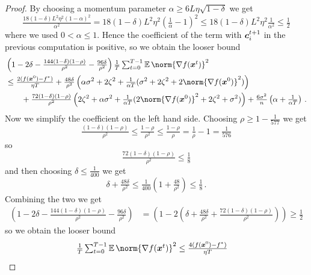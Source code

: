 \documentclass{article}
\begin{document}
\begin{proof}
  By choosing a momentum parameter $\alpha \ge 6 L \eta \sqrt{1-\delta}$ we get
  \[
    \tfrac{18 (1-\delta) L^2 \eta ^2 (1-\alpha)^2}{\alpha^2} 
    =
    18 (1-\delta) L^2 \eta^2 \left(\tfrac{1}{\alpha}-1\right)^2
    \le 
    18 (1-\delta) L^2 \eta^2 \tfrac{1}{\alpha^2}
    \le 
    \tfrac{1}{2}
  \]
  where we used $0 < \alpha \le 1$. Hence the coefficient of the term with $\bm{c}_i^{t+1}$ in the previous computation is positive, so we obtain the looser bound
  \begin{align*}
    & \left(1 - 2 \delta - \tfrac{144(1-\delta)(1-\rho)}{\rho^2} - \tfrac{96 \delta}{\rho^2} \right) \tfrac{1}{T} \tsum_{t=0}^{T-1} \E \norm{\nabla f(\xx^t)}^2 
    \\
     & \le  
    \tfrac{2(f(\xx^0) - f^\ast)}{\eta T}
     +
    \tfrac{48 \delta}{\rho^2} 
    \left(
      \alpha \sigma^2 + 2\zeta^2
      + \tfrac{1}{\alpha T}(\sigma^2 + 2 \zeta^2 + 2\norm{\nabla f(\xx^0)}^2)
    \right)
    \\
     & \qquad + 
    \tfrac{72(1-\delta)(1-\rho)}{\rho^2} 
      \left(      
          2  \zeta^2
        + \alpha\sigma^2                                             
        + \tfrac{1}{\alpha T}(2\norm{\nabla f(\xx^0) }^2
        + 2 \zeta^2
        + \sigma^2)
      \right)
     +
    \tfrac{6\sigma^2}{n} \left(\alpha + \tfrac{1}{\alpha T}\right) \, .
  \end{align*}
  Now we simplify the coefficient on the left hand side.
  Choosing $\rho \ge 1 - \tfrac{1}{577}$ we get
  \[
    \tfrac{(1-\delta)(1-\rho)}{\rho^2}
    \le 
    \tfrac{1-\rho}{\rho^2}
    \le
	\tfrac{1-\rho}{\rho}    
	=
	\tfrac{1}{\rho} - 1
	=
    \tfrac{1}{576}	
  \]
  so
  \[
    \tfrac{72(1-\delta)(1-\rho)}{\rho^2} 
    \le 
    \tfrac{1}{8}
  \]
  and then choosing $\delta \le \tfrac{1}{400}$ we get
  \[
    \delta + \tfrac{48\delta}{\rho^2}
    \le 
    \tfrac{1}{400} (1 + \tfrac{48}{\rho^2}) \le \tfrac{1}{8} 
    \, .
  \]
  Combining the two we get
  \begin{align*}
    \left(
      1 - 2 \delta - \tfrac{144(1-\delta)(1-\rho)}{\rho^2} - \tfrac{96 \delta}{\rho^2} 
    \right) 
    &=
    \left(
      1 
      - 2 \left(
        \delta 
        + \tfrac{48 \delta}{\rho^2} 
        + \tfrac{72(1-\delta)(1-\rho)}{\rho^2} 
      \right) 
    \right) 
    \ge
    \tfrac{1}{2}
  \end{align*}
  so we obtain the looser bound
  \begin{align*}
    & \tfrac{1}{T} \tsum_{t=0}^{T-1} \E \norm{\nabla f(\xx^t)}^2 
    \le  
    \tfrac{4(f(\xx^0) - f^\ast)}{\eta T}

\end{align*}
\end{proof}
\end{document}
